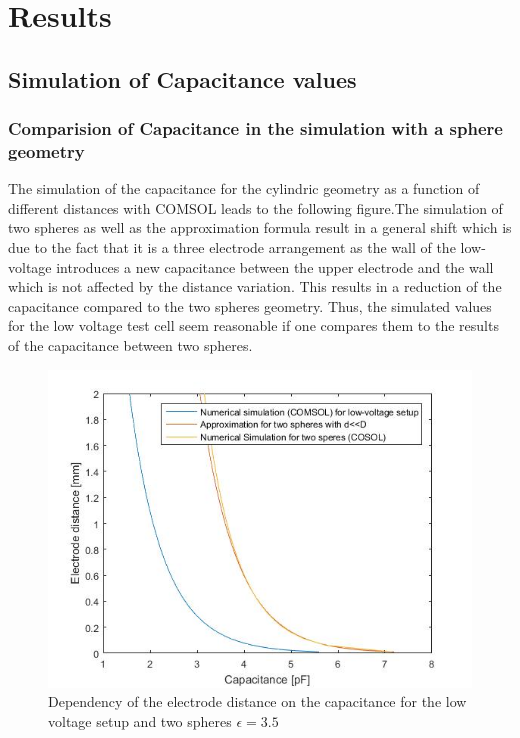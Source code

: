 
\chapter{Results}
\section{Simulation of Capacitance values}
\subsection{Comparision of Capacitance in the simulation with a sphere geometry}
The simulation of the capacitance for the cylindric geometry as a function of different distances with COMSOL leads to the following figure.The simulation of two spheres as well as the approximation formula result in a general shift which is due to the fact that it is a three electrode arrangement as the wall of the low-voltage introduces a new capacitance between the upper electrode and the wall which is not affected by the distance variation. This results in a reduction of the capacitance compared to the two spheres geometry. Thus, the simulated values for the low voltage test cell seem reasonable if one compares them to the results of the capacitance between two spheres. \newline 



\begin{figure}[]
	\centering
	\includegraphics[scale=1]{figures/Comparison_Low_voltage_Two_spheres}		
	\caption[Kurze Abbildungsbeschreibung]{Dependency of the electrode distance on the capacitance for the low voltage setup and two spheres $\epsilon = 3.5$ } 
	\label{fig.waveforms}
\end{figure}

